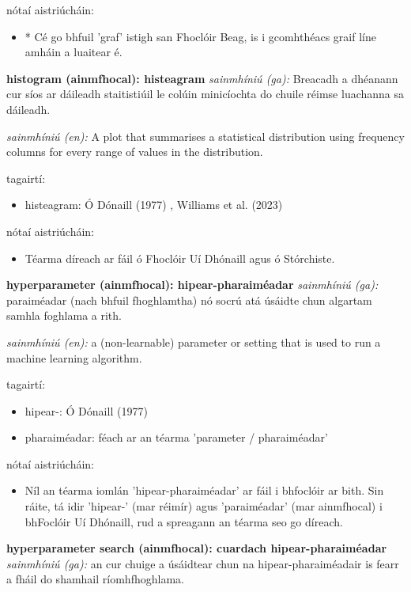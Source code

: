 \documentclass{article}
\begin{document}
nótaí aistriúcháin:
\begin{itemize}
	\item * Cé go bhfuil 'graf' istigh san Fhoclóir Beag, is i gcomhthéacs graif líne amháin a luaitear é.
\end{itemize}


\textbf{histogram (ainmfhocal): histeagram}
\textit{sainmhíniú (ga):} Breacadh a dhéanann cur síos ar dáileadh staitistiúil le colúin minicíochta do chuile réimse luachanna sa dáileadh.

\textit{sainmhíniú (en):} A plot that summarises a statistical distribution using frequency columns for every range of values in the distribution.

tagairtí:
\begin{itemize}
	\item histeagram: Ó Dónaill (1977) \cite{odonaill}, Williams et al. (2023) \cite{storchiste}
\end{itemize}

nótaí aistriúcháin:
\begin{itemize}
	\item Téarma díreach ar fáil ó Fhoclóir Uí Dhónaill agus ó Stórchiste.
\end{itemize}


\textbf{hyperparameter (ainmfhocal): hipear-pharaiméadar}
\textit{sainmhíniú (ga):} paraiméadar (nach bhfuil fhoghlamtha) nó socrú atá úsáidte chun algartam samhla foghlama a rith.

\textit{sainmhíniú (en):} a (non-learnable) parameter or setting that is used to run a machine learning algorithm.

tagairtí:
\begin{itemize}
	\item hipear-: Ó Dónaill (1977) \cite{odonaill}
	\item pharaiméadar: féach ar an téarma 'parameter / pharaiméadar'
\end{itemize}

nótaí aistriúcháin:
\begin{itemize}
	\item Níl an téarma iomlán 'hipear-pharaiméadar' ar fáil i bhfoclóir ar bith. Sin ráite, tá idir 'hipear-' (mar réimír) agus 'paraiméadar' (mar ainmfhocal) i bhFoclóir Uí Dhónaill, rud a spreagann an téarma seo go díreach.
\end{itemize}


\textbf{hyperparameter search (ainmfhocal): cuardach hipear-pharaiméadar}
\textit{sainmhíniú (ga):} an cur chuige a úsáidtear chun na hipear-pharaiméadair is fearr a fháil do shamhail ríomhfhoghlama.
\end{document}
